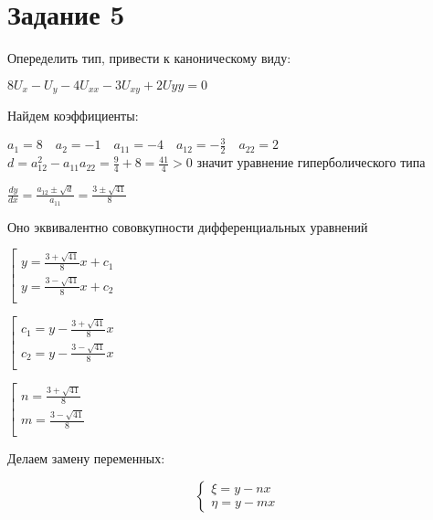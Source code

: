 \documentclass{article}
\begin{document}
	\newpage

	\section{\Large{Задание 5}}
	Опеределить тип, привести к каноническому виду:\\
	\begin{center}
		$ 8U_x - U_y - 4U_{xx} - 3U_{xy} + 2U{yy} = 0 $
	\end{center}
	Найдем коэффициенты:\\
	\begin{center}
		$ a_1=8 \quad a_2=-1 \quad a_{11}=-4 \quad a_{12}=-\frac{3}{2} \quad a_{22}=2 $\\\vspace{3mm}
		$ d = a_{12}^2 - a_{11}a_{22} = \frac{9}{4} + 8 = \frac{41}{4} > 0 $ \quad значит уравнение гиперболического типа
	\end{center} 
	\begin{center}
		$ \frac{dy}{dx} = \frac{a_{12} \pm \sqrt{d}}{a_{11}} = \frac{3 \pm \sqrt{41}}{8} $
	\end{center}
	Оно эквивалентно сововкупности дифференциальных уравнений
	\begin{center}
		$\left[ 
			\begin{gathered} 
				y = \frac{3+\sqrt{41}}{8}x + c_1 \\ 
				y = \frac{3-\sqrt{41}}{8}x + c_2 \\ 
			\end{gathered} 
			\right.$
	\end{center}
	\begin{center}
		$\left[ 
			\begin{gathered} 
				c_1 = y - \frac{3+\sqrt{41}}{8}x \\ 
				c_2 = y - \frac{3-\sqrt{41}}{8}x \\ 
			\end{gathered} 
			\right.$
	\end{center}
	\begin{center}
		$\left[ 
			\begin{gathered} 
				n = \frac{3+\sqrt{41}}{8} \\ 
				m = \frac{3-\sqrt{41}}{8} \\ 
			\end{gathered} 
			\right.$
	\end{center}
	Делаем замену переменных:
	\begin{center}
		\begin{equation*}
			\begin{cases}
				\xi = y - n x \\
				\eta = y - m x
			\end{cases}
		\end{equation*}
	\end{center}
\end{document}
